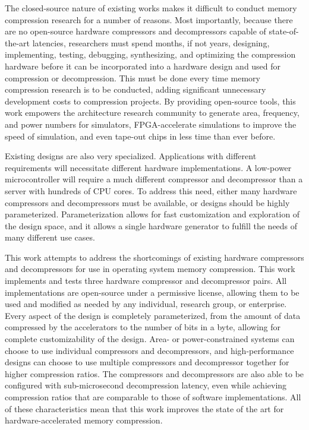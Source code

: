 \documentclass[doublespace,nopageskip]{VTthesis}
\begin{document}
The closed-source nature of existing works makes it difficult to conduct memory compression research for a number of reasons. Most importantly, because there are no open-source hardware compressors and decompressors capable of state-of-the-art latencies, researchers must spend months, if not years, designing, implementing, testing, debugging, synthesizing, and optimizing the compression hardware before it can be incorporated into a hardware design and used for compression or decompression. This must be done every time memory compression research is to be conducted, adding significant unnecessary development costs to compression projects. By providing open-source tools, this work empowers the architecture research community to generate area, frequency, and power numbers for simulators, FPGA-accelerate simulations to improve the speed of simulation, and even tape-out chips in less time than ever before.

Existing designs are also very specialized. Applications with different requirements will necessitate different hardware implementations. A low-power microcontroller will require a much different compressor and decompressor than a server with hundreds of CPU cores. To address this need, either many hardware compressors and decompressors must be available, or designs should be highly parameterized. Parameterization allows for fast customization and exploration of the design space, and it allows a single hardware generator to fulfill the needs of many different use cases.

This work attempts to address the shortcomings of existing hardware compressors and decompressors for use in operating system memory compression. This work implements and tests three hardware compressor and decompressor pairs. All implementations are open-source under a permissive license, allowing them to be used and modified as needed by any individual, research group, or enterprise. Every aspect of the design is completely parameterized, from the amount of data compressed by the accelerators to the number of bits in a byte, allowing for complete customizability of the design. Area- or power-constrained systems can choose to use individual compressors and decompressors, and high-performance designs can choose to use multiple compressors and decompressor together for higher compression ratios. The compressors and decompressors are also able to be configured with sub-microsecond decompression latency, even while achieving compression ratios that are comparable to those of software implementations. All of these characteristics mean that this work improves the state of the art for hardware-accelerated memory compression.
\end{document}
